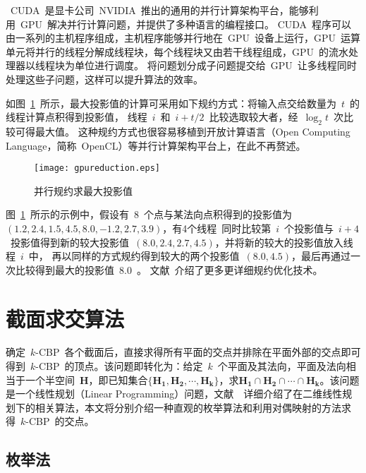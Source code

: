~CUDA~是显卡公司~NVIDIA~推出的通用的并行计算架构平台，能够利用~GPU~解决并行计算问题，并提供了多种语言的编程接口。
CUDA~程序可以由一系列的主机程序组成，主机程序能够并行地在~GPU~设备上运行，GPU~运算单元将并行的线程分解成线程块，每个线程块又由若干线程组成，GPU~的流水处理器以线程块为单位进行调度。
将问题划分成子问题提交给~GPU~让多线程同时处理这些子问题，这样可以提升算法的效率\cite{lauterbach2009fast}。

如图~\ref{lbl:reduction-getmax}~所示，最大投影值的计算可采用如下规约方式：将输入点交给数量为~$t$~的线程计算点积得到投影值，
线程~$i$~和~$i+t/2$~比较选取较大者，经~$\log_2t$~次比较可得最大值。
这种规约方式也很容易移植到开放计算语言（Open Computing Language，简称~OpenCL）等并行计算架构平台上\cite{gpgpuqiu}，在此不再赘述。

\begin{figure}[htbp] %
\centering
\texttt{[image: gpureduction.eps]}
\caption{并行规约求最大投影值}
\label{lbl:reduction-getmax}
\end{figure}

图~\ref{lbl:reduction-getmax}~所示的示例中，假设有~8~个点与某法向点积得到的投影值为~$(1.2,2.4,1.5,4.5,8.0,-1.2,2.7,3.9)$，有4个线程~同时比较第~$i$~个投影值与~$i+4$~投影值得到新的较大投影值~$(8.0,2.4,2.7,4.5)$，并将新的较大的投影值放入线程~$i$~中，
再以同样的方式规约得到较大的两个投影值~$(8.0,4.5)$，最后再通过一次比较得到最大的投影值~$8.0$~。
文献~介绍了更多更详细规约优化技术。

\section{截面求交算法}
\label{sec:intersect-planes}

确定~$k$-CBP~各个截面后，直接求得所有平面的交点并排除在平面外部的交点即可得到~$k$-CBP~的顶点。该问题即转化为：给定~$k$~个平面及其法向，平面及法向相当于一个半空间~$\bm{H}$，即已知集合$\{\bm{H_1},
\bm{H_2}, \cdots, \bm{H_k}\}$，求$\bm{H_1} \cap \bm{H_2} \cap \cdots
\cap \bm{H_k}$。该问题是一个线性规划（Linear Programming）问题，文献~~详细介绍了在二维线性规划下的相关算法，本文将分别介绍一种直观的枚举算法和利用对偶映射的方法求得~$k$-CBP~的交点。

\subsection{枚举法}
\label{subsec:intersection-enum-geometry}

